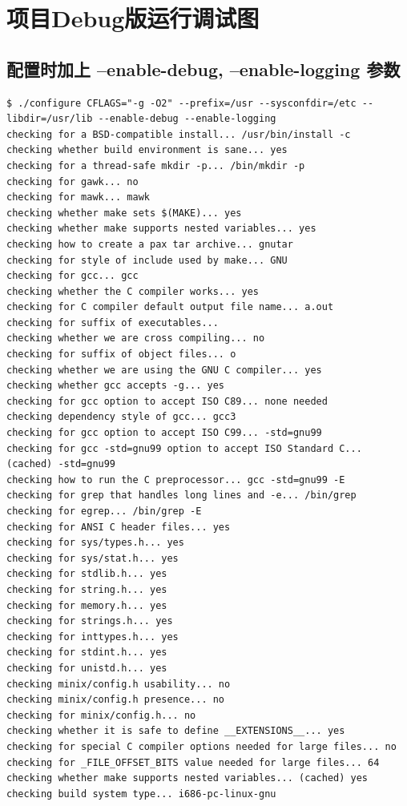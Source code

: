 \section{项目Debug版运行调试图}

\subsection{配置时加上 --enable-debug, --enable-logging 参数}

{\begin{shaded}\begin{verbatim}
$ ./configure CFLAGS="-g -O2" --prefix=/usr --sysconfdir=/etc --libdir=/usr/lib --enable-debug --enable-logging
checking for a BSD-compatible install... /usr/bin/install -c
checking whether build environment is sane... yes
checking for a thread-safe mkdir -p... /bin/mkdir -p
checking for gawk... no
checking for mawk... mawk
checking whether make sets $(MAKE)... yes
checking whether make supports nested variables... yes
checking how to create a pax tar archive... gnutar
checking for style of include used by make... GNU
checking for gcc... gcc
checking whether the C compiler works... yes
checking for C compiler default output file name... a.out
checking for suffix of executables... 
checking whether we are cross compiling... no
checking for suffix of object files... o
checking whether we are using the GNU C compiler... yes
checking whether gcc accepts -g... yes
checking for gcc option to accept ISO C89... none needed
checking dependency style of gcc... gcc3
checking for gcc option to accept ISO C99... -std=gnu99
checking for gcc -std=gnu99 option to accept ISO Standard C... (cached) -std=gnu99
checking how to run the C preprocessor... gcc -std=gnu99 -E
checking for grep that handles long lines and -e... /bin/grep
checking for egrep... /bin/grep -E
checking for ANSI C header files... yes
checking for sys/types.h... yes
checking for sys/stat.h... yes
checking for stdlib.h... yes
checking for string.h... yes
checking for memory.h... yes
checking for strings.h... yes
checking for inttypes.h... yes
checking for stdint.h... yes
checking for unistd.h... yes
checking minix/config.h usability... no
checking minix/config.h presence... no
checking for minix/config.h... no
checking whether it is safe to define __EXTENSIONS__... yes
checking for special C compiler options needed for large files... no
checking for _FILE_OFFSET_BITS value needed for large files... 64
checking whether make supports nested variables... (cached) yes
checking build system type... i686-pc-linux-gnu

\end{verbatim}
\end{shaded}}
